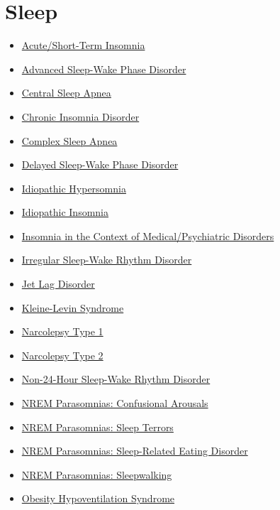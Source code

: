 \section*{Sleep}
\label{sec:organ_sleep}
\begin{itemize}[noitemsep]
  \item \hyperlink{sec:Acute Short-Term Insomnia}{Acute/Short-Term Insomnia}
  \item \hyperlink{sec:Advanced Sleep-Wake Phase Disorder}{Advanced Sleep-Wake Phase Disorder}
  \item \hyperlink{sec:Central Sleep Apnea}{Central Sleep Apnea}
  \item \hyperlink{sec:Chronic Insomnia Disorder}{Chronic Insomnia Disorder}
  \item \hyperlink{sec:Complex Sleep Apnea}{Complex Sleep Apnea}
  \item \hyperlink{sec:Delayed Sleep-Wake Phase Disorder}{Delayed Sleep-Wake Phase Disorder}
  \item \hyperlink{sec:Idiopathic Hypersomnia}{Idiopathic Hypersomnia}
  \item \hyperlink{sec:Idiopathic Insomnia}{Idiopathic Insomnia}
  \item \hyperlink{sec:Insomnia in the Context of Medical Psychiatric Disorders}{Insomnia in the Context of Medical/Psychiatric Disorders}
  \item \hyperlink{sec:Irregular Sleep-Wake Rhythm Disorder}{Irregular Sleep-Wake Rhythm Disorder}
  \item \hyperlink{sec:Jet Lag Disorder}{Jet Lag Disorder}
  \item \hyperlink{sec:Kleine-Levin Syndrome}{Kleine-Levin Syndrome}
  \item \hyperlink{sec:Narcolepsy Type 1}{Narcolepsy Type 1}
  \item \hyperlink{sec:Narcolepsy Type 2}{Narcolepsy Type 2}
  \item \hyperlink{sec:Non-24-Hour Sleep-Wake Rhythm Disorder}{Non-24-Hour Sleep-Wake Rhythm Disorder}
  \item \hyperlink{sec:Confusional Arousals}{NREM Parasomnias: Confusional Arousals}
  \item \hyperlink{sec:Sleep Terrors}{NREM Parasomnias: Sleep Terrors}
  \item \hyperlink{sec:Sleep-Related Eating Disorder}{NREM Parasomnias: Sleep-Related Eating Disorder}
  \item \hyperlink{sec:Sleepwalking}{NREM Parasomnias: Sleepwalking}
  \item \hyperlink{sec:Obesity Hypoventilation Syndrome}{Obesity Hypoventilation Syndrome}

\end{itemize}

